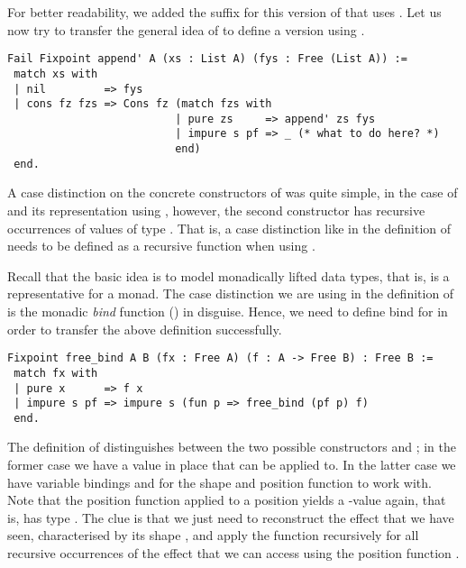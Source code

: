 For better readability, we added the suffix  for this version of  that uses .
Let us now try to transfer the general idea of  to define a version using .

\begin{verbatim}
Fail Fixpoint append' A (xs : List A) (fys : Free (List A)) :=
 match xs with
 | nil         => fys
 | cons fz fzs => Cons fz (match fzs with
                          | pure zs     => append' zs fys
                          | impure s pf => _ (* what to do here? *)
                          end)
 end.
\end{verbatim}

A case distinction on the concrete constructors of  was quite simple, in the case of  and its representation using , however, the second constructor  has recursive occurrences of values of type .
That is, a case distinction like in the definition of  needs to be defined as a recursive function when using .

Recall that the basic idea is to model monadically lifted data types, that is,  is a representative for a monad.
The case distinction we are using in the definition of  is the monadic \emph{bind} function (\cinl{(>>=)}) in disguise.
Hence, we need to define bind for  in order to transfer the above definition successfully.

\begin{verbatim}
Fixpoint free_bind A B (fx : Free A) (f : A -> Free B) : Free B :=
 match fx with
 | pure x      => f x
 | impure s pf => impure s (fun p => free_bind (pf p) f)
 end.
\end{verbatim}

The definition of  distinguishes between the two possible constructors  and ; in the former case we have a value  in place that  can be applied to.
In the latter case we have variable bindings  and  for the shape and position function to work with.
Note that the position function applied to a position yields a \--value again, that is,  has type
.
The clue is that we just need to reconstruct the effect that we have seen, characterised by its shape , and apply the function  recursively for all recursive occurrences of the effect that we can access using the position function .

